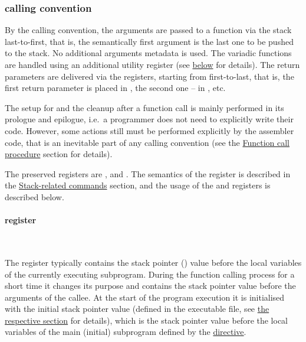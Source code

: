 \hypertarget{functions:convention}{
    \subsubsection{ calling convention}
}

\vspace{-0.2cm}

\hypertarget{karma:call:basic}{}
By the  calling convention, the arguments are passed to
a function via the stack last-to-first, that is, the semantically first argument
is the last one to be pushed to the stack.
No additional arguments metadata is used.
The variadic functions are handled using an additional utility register
 (see \hyperlink{r13}{below} for details).
The return parameters are delivered via the registers, starting from 
first-to-last, that is, the first return parameter is placed in ,
the second one -- in , etc.

The setup for and the cleanup after a function call is mainly performed
in its prologue and epilogue, i.e.\ a programmer does not need to explicitly
write their code.
However, some actions still must be performed explicitly
by the assembler code, that is an inevitable part of any calling convention
(see the \hyperlink{functions:call}{Function call procedure} section
for details).

The preserved registers are ,  and .
The semantics of the  register is described in
the \hyperlink{cmd:stack}{Stack-related commands} section, and the usage
of the  and  registers is described below.

\vspace{-0.5cm}

\hypertarget{r13}{
    \paragraph{ register}\
}

The  register typically contains the stack pointer () value
before the local variables of the currently executing subprogram.
During the function calling process for a short time it changes its purpose
and contains the stack pointer value before the arguments of
the callee.
At the start of the program execution it is initialised with the initial stack
pointer value (defined in the executable file, see
\hyperlink{executable}{the respective section} for details),
which is the stack pointer value before the local variables of the main
(initial) subprogram defined by
the \hyperlink{directives:end}{ directive}.

